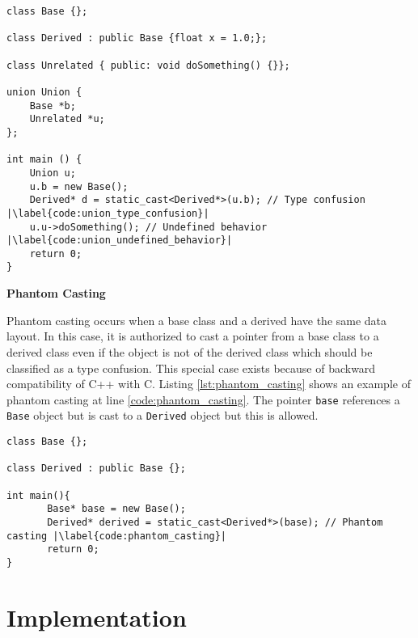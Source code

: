 \documentclass[a4paper,11pt,oneside]{report}
\begin{document}
\begin{listing}
       \begin{verbatim}
class Base {};

class Derived : public Base {float x = 1.0;};

class Unrelated { public: void doSomething() {}};

union Union {
    Base *b;
    Unrelated *u;
};

int main () {
    Union u;
    u.b = new Base(); 
    Derived* d = static_cast<Derived*>(u.b); // Type confusion |\label{code:union_type_confusion}|
    u.u->doSomething(); // Undefined behavior |\label{code:union_undefined_behavior}|
    return 0;
}
       \end{verbatim}
       \caption{Union example}
       \label{lst:union}
\end{listing}

\textbf{Phantom Casting}

\noindent{}Phantom casting occurs when a base class and a derived have the same
data layout.  In this case, it is authorized to cast a pointer from a base class
to a derived class even if the object is not of the derived class which should
be classified as a type confusion.  This special case exists because of backward
compatibility of C++ with C. Listing \autoref{lst:phantom_casting} shows an
example of phantom casting at line \ref{code:phantom_casting}.  The pointer
\texttt{base} references a \texttt{Base} object but is cast to a
\texttt{Derived} object but this is allowed.

\begin{listing}
       \begin{verbatim}
class Base {};

class Derived : public Base {};

int main(){
       Base* base = new Base();
       Derived* derived = static_cast<Derived*>(base); // Phantom casting |\label{code:phantom_casting}|
       return 0;
} 
       \end{verbatim}
       \caption{Phantom casting example}
       \label{lst:phantom_casting}

\end{listing}

\chapter{Implementation}
\end{document}
